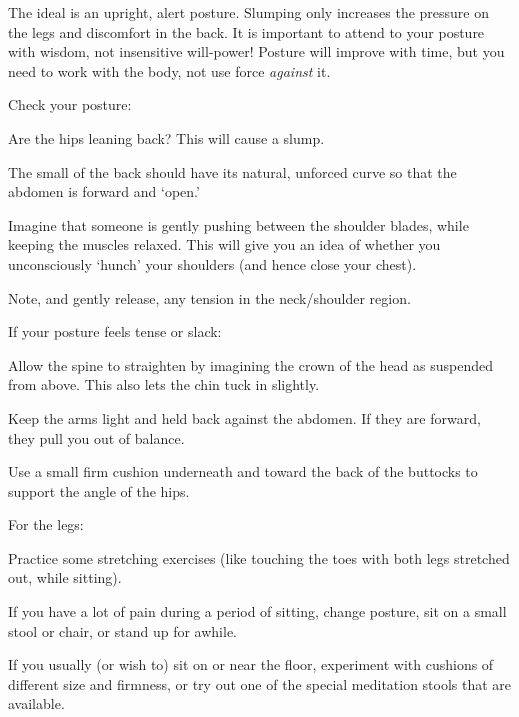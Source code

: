
The ideal is an upright, alert posture. Slumping only increases the
pressure on the legs and discomfort in the back. It is important to
attend to your posture with wisdom, not insensitive will-power! Posture
will improve with time, but you need to work with the body, not use
force \emph{against} it.

Check your posture:
\begin{packeditemize}
\item
  Are the hips leaning back? This will cause a slump.
\item
  The small of the back should have its natural, unforced curve so that
  the abdomen is forward and `open.'
\item
  Imagine that someone is gently pushing between the shoulder blades,
  while keeping the muscles relaxed. This will give you an idea of
  whether you unconsciously `hunch' your shoulders (and hence close your
  chest).
\item
  Note, and gently release, any tension in the neck/shoulder region.
\end{packeditemize}

\newpage

If your posture feels tense or slack:
\begin{packeditemize}
\item
  Allow the spine to straighten by imagining the crown of the head as
  suspended from above. This also lets the chin tuck in slightly.
\item
  Keep the arms light and held back against the abdomen. If they are
  forward, they pull you out of balance.
\item
  Use a small firm cushion underneath and toward the back of the
  buttocks to support the angle of the hips.
\end{packeditemize}

For the legs:
\begin{packeditemize}
\item
  Practice some stretching exercises (like touching the toes with both
  legs stretched out, while sitting).
\item
  If you have a lot of pain during a period of sitting, change posture,
  sit on a small stool or chair, or stand up for awhile.
\item
  If you usually (or wish to) sit on or near the floor, experiment with
  cushions of different size and firmness, or try out one of the special
  meditation stools that are available.
\end{packeditemize}

